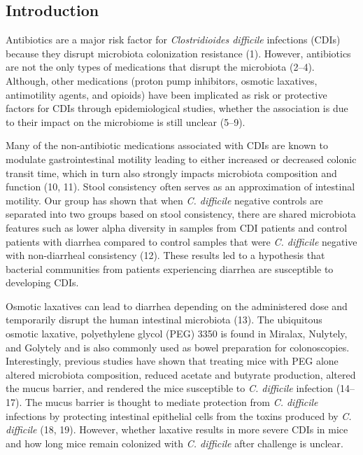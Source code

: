\documentclass[
  11pt,
]{article}
\begin{document}
\newpage

\hypertarget{introduction}{%
\subsection{Introduction}\label{introduction}}

Antibiotics are a major risk factor for \emph{Clostridioides difficile}
infections (CDIs) because they disrupt microbiota colonization
resistance (1). However, antibiotics are not the only types of
medications that disrupt the microbiota (2--4). Although, other
medications (proton pump inhibitors, osmotic laxatives, antimotility
agents, and opioids) have been implicated as risk or protective factors
for CDIs through epidemiological studies, whether the association is due
to their impact on the microbiome is still unclear (5--9).

Many of the non-antibiotic medications associated with CDIs are known to
modulate gastrointestinal motility leading to either increased or
decreased colonic transit time, which in turn also strongly impacts
microbiota composition and function (10, 11). Stool consistency often
serves as an approximation of intestinal motility. Our group has shown
that when \emph{C. difficile} negative controls are separated into two
groups based on stool consistency, there are shared microbiota features
such as lower alpha diversity in samples from CDI patients and control
patients with diarrhea compared to control samples that were \emph{C.
difficile} negative with non-diarrheal consistency (12). These results
led to a hypothesis that bacterial communities from patients
experiencing diarrhea are susceptible to developing CDIs.

Osmotic laxatives can lead to diarrhea depending on the administered
dose and temporarily disrupt the human intestinal microbiota (13). The
ubiquitous osmotic laxative, polyethylene glycol (PEG) 3350 is found in
Miralax, Nulytely, and Golytely and is also commonly used as bowel
preparation for colonoscopies. Interestingly, previous studies have
shown that treating mice with PEG alone altered microbiota composition,
reduced acetate and butyrate production, altered the mucus barrier, and
rendered the mice susceptible to \emph{C. difficile} infection (14--17).
The mucus barrier is thought to mediate protection from \emph{C.
difficile} infections by protecting intestinal epithelial cells from the
toxins produced by \emph{C. difficile} (18, 19). However, whether
laxative results in more severe CDIs in mice and how long mice remain
colonized with \emph{C. difficile} after challenge is unclear.
\end{document}
